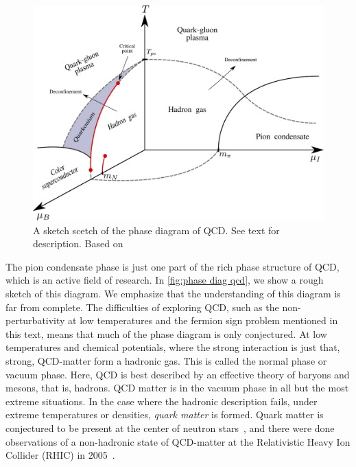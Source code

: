 \begin{figure}[ht]
    \centering
    \includegraphics[width=\textwidth]{figurer/phase_diagram2.pdf}
    \caption{A sketch scetch of the phase diagram of QCD. See text for description. Based on~\cite{from_hadrons_to_quarks,
            Brandt:QCD_phase_diagram_with_isospin_chemical_potential,Brandt:QCD_phase_diagram_for_nonzero_isospin-asymmetry,Fukushima:The_phase_diagram_of_dense_QCD,mannarelli:meson_condensation,alford:color_superconductivity}
    }
    \label{fig:phase diag qcd}
\end{figure}

The pion condensate phase is just one part of the rich phase structure of QCD, which is an active field of research.
In \autoref{fig:phase diag qcd}, we show a rough sketch of this diagram.
We emphasize that the understanding of this diagram is far from complete.
The difficulties of exploring QCD, such as the non-perturbativity at low temperatures and the fermion sign problem mentioned in this text, means that much of the phase diagram is only conjectured.
At low temperatures and chemical potentials, where the strong interaction is just that, strong, QCD-matter form a hadronic gas.
This is called the normal phase or vacuum phase.
Here, QCD is best described by an effective theory of baryons and mesons, that is, hadrons.
QCD matter is in the vacuum phase in all but the most extreme situations.
In the case where the hadronic description fails, under extreme temperatures or densities, \emph{quark matter} is formed.
Quark matter is conjectured to be present at the center of neutron stars~\cite{from_hadrons_to_quarks}, and there were done observations of a non-hadronic state of QCD-matter at the Relativistic Heavy Ion Collider (RHIC) in 2005~\cite{2005:RHIC,2005:RHIC2}.

